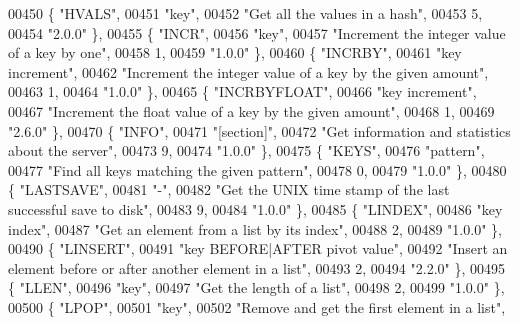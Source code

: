 \begin{DoxyCode}
00450     \{ \textcolor{stringliteral}{"HVALS"},
00451     \textcolor{stringliteral}{"key"},
00452     \textcolor{stringliteral}{"Get all the values in a hash"},
00453     5,
00454     \textcolor{stringliteral}{"2.0.0"} \},
00455     \{ \textcolor{stringliteral}{"INCR"},
00456     \textcolor{stringliteral}{"key"},
00457     \textcolor{stringliteral}{"Increment the integer value of a key by one"},
00458     1,
00459     \textcolor{stringliteral}{"1.0.0"} \},
00460     \{ \textcolor{stringliteral}{"INCRBY"},
00461     \textcolor{stringliteral}{"key increment"},
00462     \textcolor{stringliteral}{"Increment the integer value of a key by the given amount"},
00463     1,
00464     \textcolor{stringliteral}{"1.0.0"} \},
00465     \{ \textcolor{stringliteral}{"INCRBYFLOAT"},
00466     \textcolor{stringliteral}{"key increment"},
00467     \textcolor{stringliteral}{"Increment the float value of a key by the given amount"},
00468     1,
00469     \textcolor{stringliteral}{"2.6.0"} \},
00470     \{ \textcolor{stringliteral}{"INFO"},
00471     \textcolor{stringliteral}{"[section]"},
00472     \textcolor{stringliteral}{"Get information and statistics about the server"},
00473     9,
00474     \textcolor{stringliteral}{"1.0.0"} \},
00475     \{ \textcolor{stringliteral}{"KEYS"},
00476     \textcolor{stringliteral}{"pattern"},
00477     \textcolor{stringliteral}{"Find all keys matching the given pattern"},
00478     0,
00479     \textcolor{stringliteral}{"1.0.0"} \},
00480     \{ \textcolor{stringliteral}{"LASTSAVE"},
00481     \textcolor{stringliteral}{"-"},
00482     \textcolor{stringliteral}{"Get the UNIX time stamp of the last successful save to disk"},
00483     9,
00484     \textcolor{stringliteral}{"1.0.0"} \},
00485     \{ \textcolor{stringliteral}{"LINDEX"},
00486     \textcolor{stringliteral}{"key index"},
00487     \textcolor{stringliteral}{"Get an element from a list by its index"},
00488     2,
00489     \textcolor{stringliteral}{"1.0.0"} \},
00490     \{ \textcolor{stringliteral}{"LINSERT"},
00491     \textcolor{stringliteral}{"key BEFORE|AFTER pivot value"},
00492     \textcolor{stringliteral}{"Insert an element before or after another element in a list"},
00493     2,
00494     \textcolor{stringliteral}{"2.2.0"} \},
00495     \{ \textcolor{stringliteral}{"LLEN"},
00496     \textcolor{stringliteral}{"key"},
00497     \textcolor{stringliteral}{"Get the length of a list"},
00498     2,
00499     \textcolor{stringliteral}{"1.0.0"} \},
00500     \{ \textcolor{stringliteral}{"LPOP"},
00501     \textcolor{stringliteral}{"key"},
00502     \textcolor{stringliteral}{"Remove and get the first element in a list"},

\end{DoxyCode}
